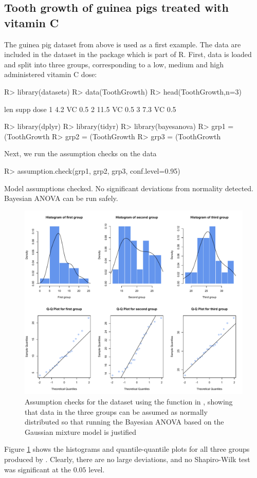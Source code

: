 \subsection{Tooth growth of guinea pigs treated with vitamin C}
The guinea pig dataset from above is used as a first example. The data are included in the dataset  in the  package which is part of R. First, data is loaded and split into three groups, corresponding to a low, medium and high administered vitamin C dose:
\begin{example}
R> library(datasets)
R> data(ToothGrowth)
R> head(ToothGrowth,n=3)

   len supp dose
1  4.2   VC  0.5
2 11.5   VC  0.5
3  7.3   VC  0.5

R> library(dplyr)
R> library(tidyr)
R> library(bayesanova)
R> grp1 = (ToothGrowth %
R> grp2 = (ToothGrowth %
R> grp3 = (ToothGrowth %
\end{example}
Next, we run the assumption checks on the data
\begin{example}
R> assumption.check(grp1, grp2, grp3, conf.level=0.95)

Model assumptions checked. No significant deviations from normality detected. 
Bayesian ANOVA can be run safely.	
\end{example}
\begin{figure}[h!]
\centering
\includegraphics[width=\textwidth]{assumptionsTG}
\caption{Assumption checks for the  dataset using the  function in , showing that data in the three groups can be assumed as normally distributed so that running the Bayesian ANOVA based on the Gaussian mixture model is justified}
\label{fig:assumptionsTG}
\end{figure}
Figure \ref{fig:assumptionsTG} shows the histograms and quantile-quantile plots for all three groups produced by . Clearly, there are no large deviations, and no Shapiro-Wilk test was significant at the $0.05$ level.

